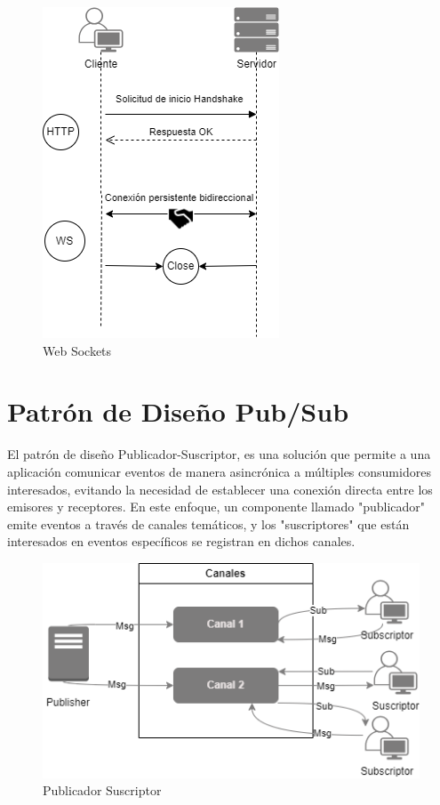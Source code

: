 \begin{figure}[h]
    \centering
    \includegraphics[width=0.5\linewidth]{fig/sockets.png}
    \caption{Web Sockets}
    \label{fig:sockets}
\end{figure}




\section{Patrón de Diseño Pub/Sub}\label{sec:pub-sub}

El patrón de diseño Publicador-Suscriptor, es una solución que permite a una aplicación comunicar eventos de manera asincrónica a múltiples consumidores interesados, evitando la necesidad de establecer una conexión directa entre los emisores y receptores. En este enfoque, un componente llamado "publicador" emite eventos a través de canales temáticos, y los "suscriptores" que están interesados en eventos específicos se registran en dichos canales.


\begin{figure}[h]
    \centering
    \includegraphics[width=0.8\linewidth]{fig/chanels.png}
    \caption{Publicador Suscriptor}
    \label{fig:pub-sus}
\end{figure}

